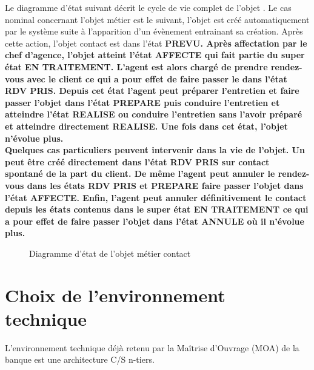 Le diagramme d'état suivant décrit le cycle de vie complet de l'objet . Le cas nominal concernant l'objet métier  est le suivant, l'objet est créé automatiquement par le système suite à l'apparition d'un évènement entrainant sa création. Après cette action, l'objet contact est dans l'état \bf{PREVU}. Après affectation par le chef d'agence, l'objet  atteint l'état \bf{AFFECTE} qui fait partie du super état \bf{EN TRAITEMENT}. L'agent est alors chargé de prendre rendez-vous avec le client ce qui a pour effet de faire passer le  dans l'état \bf{RDV PRIS}. Depuis cet état l'agent peut préparer l'entretien et faire passer l'objet  dans l'état \bf{PREPARE} puis conduire l'entretien et atteindre l'état \bf{REALISE} ou conduire l'entretien sans l'avoir préparé et atteindre directement \bf{REALISE}. Une fois dans cet état, l'objet  n'évolue plus. \\
Quelques cas particuliers peuvent intervenir dans la vie de l'objet. Un  peut être créé directement dans l'état \bf{RDV PRIS} sur contact spontané de la part du client. De même l'agent peut annuler le rendez-vous dans les états \bf{RDV PRIS} et \bf{PREPARE} faire passer l'objet  dans l'état \bf{AFFECTE}. Enfin, l'agent peut annuler définitivement le contact depuis les états contenus dans le super état \bf{EN TRAITEMENT} ce qui a pour effet de faire passer l'objet  dans l'état \bf{ANNULE} où il n'évolue plus.

\begin{figure}[H]
\noindent{}
\caption{Diagramme d'état de l'objet métier contact}
\end{figure}

\section{Choix  de  l’environnement  technique}
L’environnement  technique  déjà  retenu  par  la 
Maîtrise d’Ouvrage (MOA) de la banque est une architecture C/S n-tiers. 
